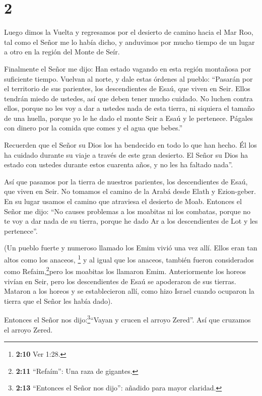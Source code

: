 \hypertarget{section-1}{%
\section{2}\label{section-1}}

 Luego dimos la Vuelta y regresamos por el desierto de
camino hacia el Mar Roo, tal como el Señor me lo había dicho, y
anduvimos por mucho tiempo de un lugar a otro en la región del Monte de
Seír.

 Finalmente el Señor me dijo:  Han estado
vagando en esta región montañosa por suficiente tiempo. Vuelvan al
norte,  y dale estas órdenes al pueblo: ``Pasarán por el
territorio de sus parientes, los descendientes de Esaú, que viven en
Seir. Ellos tendrán miedo de ustedes, así que deben tener mucho cuidado.
 No luchen contra ellos, porque no les voy a dar a ustedes
nada de esta tierra, ni siquiera el tamaño de una huella, porque yo le
he dado el monte Seir a Esaú y le pertenece.  Págales con
dinero por la comida que comes y el agua que bebes.''

 Recuerden que el Señor su Dios los ha bendecido en todo lo
que han hecho. Él los ha cuidado durante su viaje a través de este gran
desierto. El Señor su Dios ha estado con ustedes durante estos cuarenta
años, y no les ha faltado nada''.

 Así que pasamos por la tierra de nuestros parientes, los
descendientes de Esaú, que viven en Seir. No tomamos el camino de la
Arabá desde Elath y Ezion-geber. En su lugar usamos el camino que
atraviesa el desierto de Moab.  Entonces el Señor me dijo:
``No causes problemas a los moabitas ni los combatas, porque no te voy a
dar nada de su tierra, porque he dado Ar a los descendientes de Lot y
les pertenece''.

 (Un pueblo fuerte y numeroso llamado los Emim vivió una
vez allí. Ellos eran tan altos como los anaceos, \footnote{\textbf{2:10}
  Ver 1:28.}  y al igual que los anaceos, también fueron
considerados como Refaim,\footnote{\textbf{2:11} ``Refaím'': Una raza de
  gigantes.}pero los moabitas los llamaron Emim. 
Anteriormente los horeos vivían en Seir, pero los descendientes de Esaú
se apoderaron de sus tierras. Mataron a los horeos y se establecieron
allí, como hizo Israel cuando ocuparon la tierra que el Señor les había
dado).

 Entonces el Señor nos dijo:\footnote{\textbf{2:13}
  ``Entonces el Señor nos dijo'': añadido para mayor claridad.}``Vayan y
crucen el arroyo Zered''. Así que cruzamos el arroyo Zered.


